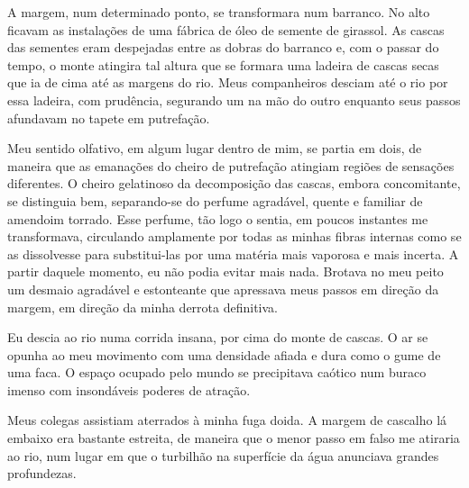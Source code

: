 A margem, num determinado ponto, se transformara num barranco. No alto ficavam
as instalações de uma fábrica de óleo de semente de girassol. As cascas das
sementes eram despejadas entre as dobras do barranco e, com o passar do
tempo, o monte atingira tal altura que se formara uma ladeira de cascas secas
que ia de cima até as margens do rio. Meus companheiros desciam até o rio por
essa ladeira, com prudência, segurando um na mão do outro enquanto seus
passos afundavam no tapete em putrefação.



Meu sentido olfativo, em algum lugar dentro de mim, se partia em dois, de
maneira que as emanações do cheiro de putrefação atingiam regiões de
sensações diferentes. O cheiro gelatinoso da decomposição das cascas, embora
concomitante, se distinguia bem, separando-se do perfume agradável, quente e
familiar de amendoim torrado. Esse perfume, tão logo o sentia, em poucos
instantes me transformava, circulando amplamente por todas as minhas fibras
internas como se as dissolvesse para substitui-las por uma matéria mais
vaporosa e mais incerta. A partir daquele momento, eu não podia evitar mais
nada. Brotava no meu peito um desmaio agradável e estonteante que apressava
meus passos em direção da margem, em direção da minha derrota definitiva.

Eu descia ao rio numa corrida insana, por cima do monte de cascas. O ar se
opunha ao meu movimento com uma densidade afiada e dura como o gume de uma
faca. O espaço ocupado pelo mundo se precipitava caótico num buraco imenso
com insondáveis poderes de atração.

Meus colegas assistiam aterrados à minha fuga doida. A margem de cascalho lá
embaixo era bastante estreita, de maneira que o menor passo em falso me
atiraria ao rio, num lugar em que o turbilhão na superfície da água anunciava
grandes profundezas.

